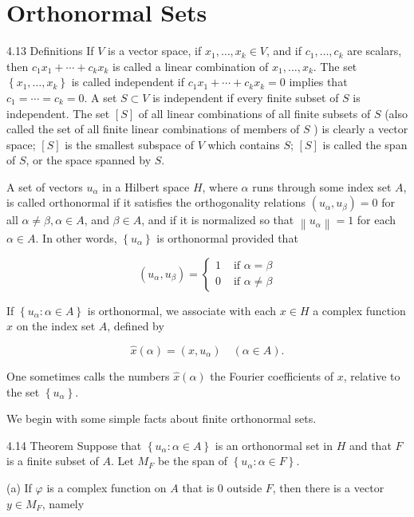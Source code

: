 \documentclass[10pt]{article}
\begin{document}
\section{Orthonormal Sets}
4.13 Definitions If $V$ is a vector space, if $x_{1}, \ldots, x_{k} \in V$, and if $c_{1}, \ldots, c_{k}$ are scalars, then $c_{1} x_{1}+\cdots+c_{k} x_{k}$ is called a linear combination of $x_{1}, \ldots, x_{k}$. The set $\left\{x_{1}, \ldots, x_{k}\right\}$ is called independent if $c_{1} x_{1}+\cdots+c_{k} x_{k}=0$ implies that $c_{1}=\cdots=c_{k}=0$. A set $S \subset V$ is independent if every finite subset of $S$ is independent. The set $[S]$ of all linear combinations of all finite subsets of $S$ (also called the set of all finite linear combinations of members of $S$ ) is clearly a vector space; $[S]$ is the smallest subspace of $V$ which contains $S$; $[S]$ is called the span of $S$, or the space spanned by $S$.

A set of vectors $u_{\alpha}$ in a Hilbert space $H$, where $\alpha$ runs through some index set $A$, is called orthonormal if it satisfies the orthogonality relations $\left(u_{\alpha}, u_{\beta}\right)=0$ for all $\alpha \neq \beta, \alpha \in A$, and $\beta \in A$, and if it is normalized so that $\left\|u_{\alpha}\right\|=1$ for each $\alpha \in A$. In other words, $\left\{u_{\alpha}\right\}$ is orthonormal provided that

$$
\left(u_{\alpha}, u_{\beta}\right)= \begin{cases}1 & \text { if } \alpha=\beta \\ 0 & \text { if } \alpha \neq \beta\end{cases}
$$

If $\left\{u_{\alpha}: \alpha \in A\right\}$ is orthonormal, we associate with each $x \in H$ a complex function $\hat{x}$ on the index set $A$, defined by

$$
\hat{x}(\alpha)=\left(x, u_{\alpha}\right) \quad(\alpha \in A) .
$$

One sometimes calls the numbers $\hat{x}(\alpha)$ the Fourier coefficients of $x$, relative to the set $\left\{u_{\alpha}\right\}$.

We begin with some simple facts about finite orthonormal sets.

4.14 Theorem Suppose that $\left\{u_{\alpha}: \alpha \in A\right\}$ is an orthonormal set in $H$ and that $F$ is a finite subset of $A$. Let $M_{F}$ be the span of $\left\{u_{\alpha}: \alpha \in F\right\}$.

(a) If $\varphi$ is a complex function on $A$ that is 0 outside $F$, then there is a vector $y \in M_{F}$, namely
\end{document}
